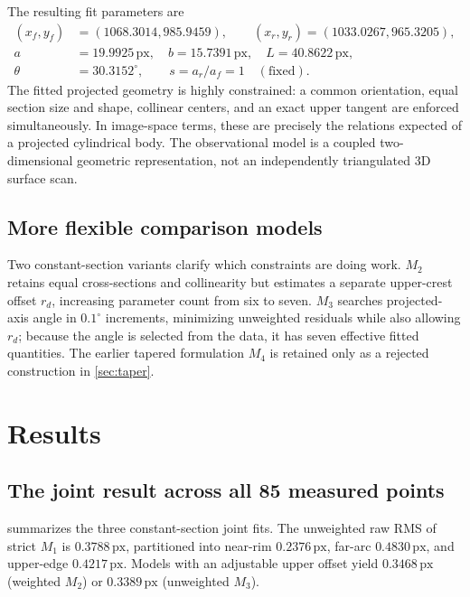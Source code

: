\documentclass[11pt,letterpaper]{article}
\newcommand{\px}{\,\mathrm{px}}
\begin{document}
The resulting fit parameters are
\begin{equation}
\begin{aligned}
 (x_f,y_f)&=(1068.3014,985.9459),\qquad
 (x_r,y_r)=(1033.0267,965.3205),\\
 a&=19.9925\px,\quad b=15.7391\px,\quad
 L=40.8622\px,\\
 \theta&=30.3152^\circ,\qquad s=a_r/a_f=1\quad(\text{fixed}).
\end{aligned}
\end{equation}
The fitted projected geometry is highly constrained: a common orientation, equal section size and shape, collinear centers, and an exact upper tangent are enforced simultaneously. In image-space terms, these are precisely the relations expected of a projected cylindrical body. The observational model is a coupled two-dimensional geometric representation, not an independently triangulated 3D surface scan.

\subsection{More flexible comparison models}

Two constant-section variants clarify which constraints are doing work. \(M_2\) retains equal cross-sections and collinearity but estimates a separate upper-crest offset \(r_d\), increasing parameter count from six to seven. \(M_3\) searches projected-axis angle in \(0.1^\circ\) increments, minimizing unweighted residuals while also allowing \(r_d\); because the angle is selected from the data, it has seven effective fitted quantities. The earlier tapered formulation \(M_4\) is retained only as a rejected construction in \cref{sec:taper}.

\section{Results}
\label{sec:results}

\subsection{The joint result across all 85 measured points}

 summarizes the three constant-section joint fits. The unweighted raw RMS of strict \(M_1\) is \(0.3788\px\), partitioned into near-rim \(0.2376\px\), far-arc \(0.4830\px\), and upper-edge \(0.4217\px\). Models with an adjustable upper offset yield \(0.3468\px\) (weighted \(M_2\)) or \(0.3389\px\) (unweighted \(M_3\)).
\end{document}
